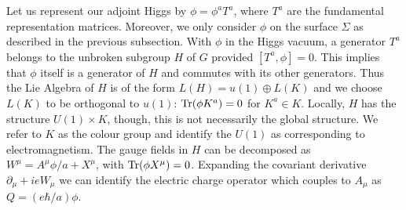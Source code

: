 Let us represent our adjoint Higgs by $\phi=\phi^a T^a$, where $T^a$
are the fundamental representation matrices. Moreover, we only
consider $\phi$ on the surface $\Sigma$ as described in the previous
subsection. With $\phi$ in the Higgs vacuum, a generator $T^a$ belongs
to the unbroken subgroup $H$ of $G$ provided $[T^a,\phi]=0$. This
implies that $\phi$ itself is a generator of $H$ and commutes with its
other generators. Thus the Lie Algebra of $H$ is of the form
$L(H)=u(1)\oplus L(K)$ and we choose $L(K)$ to be orthogonal to
$u(1)$: ${\rm Tr}(\phi K^a)=0$ for $K^a\in K$.  Locally, $H$ has the
structure $U(1)\times K$, though, this is not necessarily the global
structure. We refer to $K$ as the colour group and identify the $U(1)$
as corresponding to electromagnetism. The gauge fields in $H$ can
be decomposed as $W^\mu=A^\mu\phi/a + X^\mu$, with ${\rm Tr}(\phi
X^\mu)=0$. Expanding the covariant derivative $\partial_\mu+ ie W_\mu$
we can identify the electric charge operator which couples to $A_\mu$
as $Q=(e\hbar/a)\phi$.

